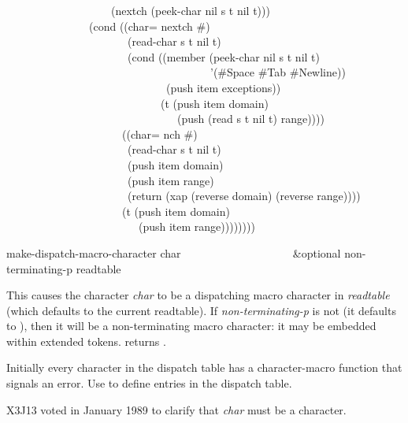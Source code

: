 \begin{table}
\begin{new}
\begin{lisp}
~~~~~~~~~~~~~~~~~~~(nextch (peek-char nil s t nil t))) \\
~~~~~~~~~~~~~~~(cond ((char= nextch \#{\Xbackslash}{\Xarrowright}) \\
~~~~~~~~~~~~~~~~~~~~~~(read-char s t nil t) \\
~~~~~~~~~~~~~~~~~~~~~~(cond ((member (peek-char nil s t nil t) \\
~~~~~~~~~~~~~~~~~~~~~~~~~~~~~~~~~~~~~'(\#{\Xbackslash}Space \#{\Xbackslash}Tab \#{\Xbackslash}Newline)) \\
~~~~~~~~~~~~~~~~~~~~~~~~~~~~~(push item exceptions)) \\
~~~~~~~~~~~~~~~~~~~~~~~~~~~~(t (push item domain) \\
~~~~~~~~~~~~~~~~~~~~~~~~~~~~~~~(push (read s t nil t) range)))) \\
~~~~~~~~~~~~~~~~~~~~~((char= nch \#{\Xbackslash}{\Xrbrace}) \\
~~~~~~~~~~~~~~~~~~~~~~(read-char s t nil t) \\
~~~~~~~~~~~~~~~~~~~~~~(push item domain) \\
~~~~~~~~~~~~~~~~~~~~~~(push item range) \\
~~~~~~~~~~~~~~~~~~~~~~(return (xap (reverse domain) (reverse range)))) \\
~~~~~~~~~~~~~~~~~~~~~(t (push item domain) \\
~~~~~~~~~~~~~~~~~~~~~~~~(push item range))))))))
\end{lisp}
\end{new}
\end{table}

\begin{defun}[Function]
make-dispatch-macro-character char ~~~~~~~~~~~~~~~~~~~ &optional non-terminating-p readtable

This causes the character {\it char} to be a dispatching macro character
in {\it readtable} (which defaults to the current readtable).
If {\it non-terminating-p} is not {\false} (it defaults to {\false}),
then it will be a non-terminating macro character: it may be embedded
within extended tokens.
 returns {\true}.

Initially every character in the dispatch table has a character-macro
function that signals an error.  Use 
to define entries in the dispatch table.
\begin{new}
X3J13 voted in January 1989
to clarify that {\it char} must be a character.
\end{new}

\end{defun}

